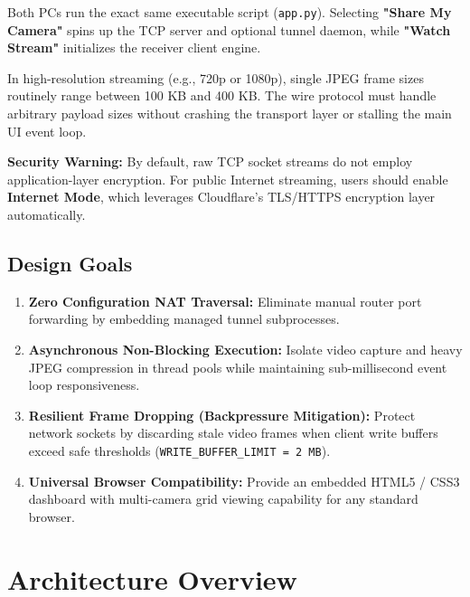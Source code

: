 \documentclass[11pt,a4paper]{article}
\begin{document}
\begin{notebox}
    Both PCs run the exact same executable script (\texttt{app.py}). Selecting \textbf{"Share My Camera"} spins up the TCP server and optional tunnel daemon, while \textbf{"Watch Stream"} initializes the receiver client engine.
\end{notebox}

\begin{warnbox}
    In high-resolution streaming (e.g., 720p or 1080p), single JPEG frame sizes routinely range between 100 KB and 400 KB. The wire protocol must handle arbitrary payload sizes without crashing the transport layer or stalling the main UI event loop.
\end{warnbox}

\begin{alertbox}
    \textbf{Security Warning:} By default, raw TCP socket streams do not employ application-layer encryption. For public Internet streaming, users should enable \textbf{Internet Mode}, which leverages Cloudflare's TLS/HTTPS encryption layer automatically.
\end{alertbox}

\subsection{Design Goals}
\begin{enumerate}
    \item \textbf{Zero Configuration NAT Traversal:} Eliminate manual router port forwarding by embedding managed tunnel subprocesses.
    \item \textbf{Asynchronous Non-Blocking Execution:} Isolate video capture and heavy JPEG compression in thread pools while maintaining sub-millisecond event loop responsiveness.
    \item \textbf{Resilient Frame Dropping (Backpressure Mitigation):} Protect network sockets by discarding stale video frames when client write buffers exceed safe thresholds (\texttt{WRITE\_BUFFER\_LIMIT = 2 MB}).
    \item \textbf{Universal Browser Compatibility:} Provide an embedded HTML5 / CSS3 dashboard with multi-camera grid viewing capability for any standard browser.
\end{enumerate}

\newpage

\section{Architecture Overview}
\end{document}
